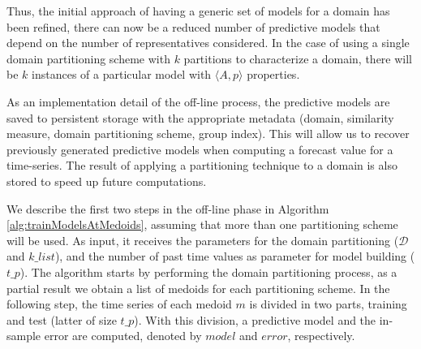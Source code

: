 Thus, the initial approach of having a generic set of models for a domain has been refined, there can now be a reduced number of predictive models that depend on the number of representatives considered. In the case of using a single domain partitioning scheme with $k$ partitions to characterize a domain, there will be $k$ instances of a particular model with $\langle A, p \rangle$ properties. 

As an implementation detail of the off-line process, the predictive models are saved to persistent storage with the appropriate metadata (domain, similarity measure, domain partitioning scheme, group index). This will allow us to recover previously generated predictive models when computing a forecast value for a time-series. The result of applying a partitioning technique to a domain is also stored to speed up future computations.

We describe the first two steps in the off-line phase in Algorithm \ref{alg:trainModelsAtMedoids}, assuming that more than one partitioning scheme will be used. As input, it receives the parameters for the domain partitioning ($\mathcal{D}$ and $k\_list$), and the number of past time values as parameter for model building ($t\_p$). The algorithm starts by performing the domain partitioning process, as a partial result we obtain a list of medoids for each partitioning scheme. In the following step, the time series of each medoid $m$ is divided in two parts, training and test (latter of size $t\_p$). With this division, a predictive model and the in-sample error are computed, denoted by $model$ and $error$, respectively.

